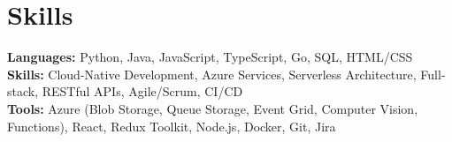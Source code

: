 \documentclass[11pt]{article}       %
\begin{document}

\vspace{-18.5pt}

\section*{Skills}
\textbf{Languages:} Python, Java, JavaScript, TypeScript, Go, SQL, HTML/CSS\\
\textbf{Skills:} Cloud-Native Development, Azure Services, Serverless Architecture, Full-stack, RESTful APIs, Agile/Scrum, CI/CD\\
\textbf{Tools:} Azure (Blob Storage, Queue Storage, Event Grid, Computer Vision, Functions), React, Redux Toolkit, Node.js, Docker, Git, Jira\\

\vspace{-6.5pt}
\end{document}
